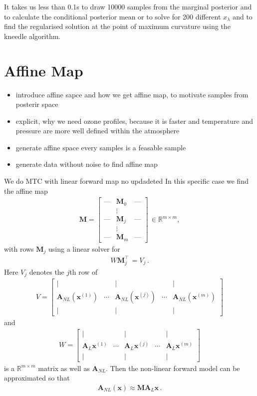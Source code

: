 It takes us less than 0.1s to draw 10000 samples from the marginal posterior and to calculate the conditional posterior mean or to solve for 200 different $x_{\lambda}$ and to find the regularised solution at the point of maximum curvature using the kneedle algorithm.\\


\section{Affine Map} 
\label{sec:affineMap}
\begin{itemize}
	\item introduce affine sapce and how we get affine map, to motivate samples from posterir space
	\item explicit, why we need ozone profiles, because it is faster and temperature and pressure are more well defined within the atmosphere
	\item generate affine space every samples is a feasable sample
	\item generate data without noise to find affine map
\end{itemize}
We do MTC with linear forward map no updadeted
In this specific case we find the affine map
\begin{align}
	\bm{M} = \begin{bmatrix}
		\text{---} & \bm{M}_0 &   \text{---}  \\
		&  \vdots  & \\
		\text{---}& \bm{M}_j &  \text{---} \\
		&  \vdots  & \\
		\text{---} & \bm{M}_m &   \text{---}
	\end{bmatrix} \, \in \mathbb{R}^{m \times m} ,
\end{align}
with rows $\bm{M}_j$ using a linear solver for
\begin{align}
	W \bm{M}_j^\top \, = V_{j} \, .
\end{align}
Here $V_j$ denotes the $j$th row of  
\begin{align}
	V = \begin{bmatrix}
		\vert&   &  \vert & & \vert \\
		\bm{A}_{NL} (\bm{x}^{(1)} ) &  \cdots& \bm{A}_{NL} (\bm{x}^{(j)} )&  \cdots & \bm{A}_{NL} (\bm{x}^{(m)})  \\
		\vert&   &  \vert & & \vert 
	\end{bmatrix}
\end{align}
and
\begin{align}
	W = \begin{bmatrix}
		\vert&   &  \vert & & \vert \\
		\bm{A}_{L} \bm{x}^{(1)} &  \cdots& \bm{A}_{L} \bm{x}^{(j)} &  \cdots & \bm{A}_{L} \bm{x}^{(m)} \\
		\vert&   &  \vert & & \vert 
	\end{bmatrix}
\end{align}
is a $\mathbb{R}^{m \times m} $ matrix as well as $\bm{A}_{NL}$.
Then the non-linear forward model can be approximated so that
\begin{align}
	\bm{A}_{NL}(\bm{x}) \approx \bm{M A}_L \bm{x}\, .
\end{align}

